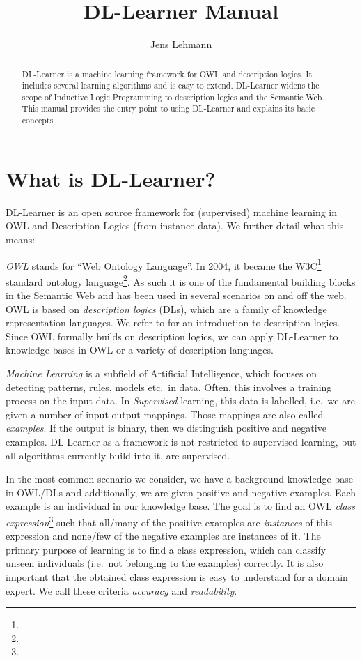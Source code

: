 \documentclass[a4paper,12pt]{scrartcl}
\title{DL-Learner Manual}
\author{Jens Lehmann}
\begin{document}
\maketitle

\begin{abstract}
DL-Learner is a machine learning framework for OWL and description logics. It includes several learning algorithms and is easy to extend. DL-Learner widens the scope of Inductive Logic Programming to description logics and the Semantic Web. This manual provides the entry point to using DL-Learner and explains its basic concepts.
\end{abstract}

\tableofcontents

\clearpage

\section{What is DL-Learner?}
\label{sec:whatis}

DL-Learner is an open source framework for (supervised) machine learning in OWL and Description Logics (from instance data). We further detail what this means:

\emph{OWL} stands for ``Web Ontology Language''. In 2004, it became the W3C\footnote{\wwwc} standard ontology language\footnote{\owl}. As such it is one of the fundamental building blocks in the Semantic Web and has been used in several scenarios on and off the web. OWL is based on \emph{description logics} (DLs), which are a family of knowledge representation languages. We refer to \cite{dlhb} for an introduction to description logics. Since OWL formally builds on description logics, we can apply DL-Learner to knowledge bases in OWL or a variety of description languages.

\emph{Machine Learning} is a subfield of Artificial Intelligence, which focuses on detecting patterns, rules, models etc.~in data. Often, this involves a training process on the input data. In \emph{Supervised} learning, this data is labelled, i.e.~we are given a number of input-output mappings. Those mappings are also called \emph{examples}. If the output is binary, then we distinguish positive and negative examples. DL-Learner as a framework is not restricted to supervised learning, but all algorithms currently build into it, are supervised.

In the most common scenario we consider, we have a background knowledge base in OWL/DLs and additionally, we are given positive and negative examples. Each example is an individual in our knowledge base. The goal is to find an OWL \emph{class expression}\footnote{\owlce} such that all/many of the positive examples are \emph{instances} of this expression and none/few of the negative examples are instances of it. The primary purpose of learning is to find a class expression, which can classify unseen individuals (i.e.~not belonging to the examples) correctly. It is also important that the obtained class expression is easy to understand for a domain expert. We call these criteria \emph{accuracy} and \emph{readability}.
\end{document}
